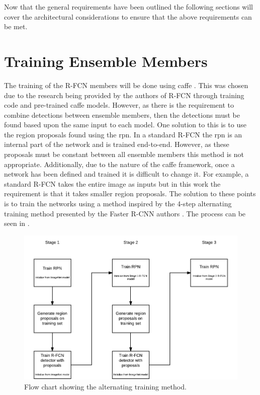 Now that the general requirements have been outlined the following sections will cover the architectural considerations to ensure that the above requirements can be met.

\section{Training Ensemble Members}
The training of the R-FCN members will be done using \gls{caffe} \cite{caffe}. This was chosen due to the research being provided by the authors of R-FCN through training code and pre-trained \gls{caffe} models. However, as there is the requirement to combine detections between ensemble members, then the detections must be found based upon the same input to each model. One solution to this is to use the region proposals found using the \gls{rpn}. In a standard R-FCN the \gls{rpn} is an internal part of the network and is trained end-to-end. However, as these proposals must be constant between all ensemble members this method is not appropriate. Additionally, due to the nature of the \gls{caffe} framework, once a network has been defined and trained it is difficult to change it. For example, a standard R-FCN takes the entire image as inputs but in this work the requirement is that it takes smaller region proposals. The solution to these points is to train the networks using a method inspired by the 4-step alternating training method presented by the Faster R-CNN authors \cite{fasterrcnn}. The process can be seen in .

 \begin{figure}[H]
  \centering
    \includegraphics[width=1.0\textwidth]{Figs/Design/4steptrain1.pdf}
      \caption{Flow chart showing the alternating training method.}
    \label{fig:4steptrain}
\end{figure}

